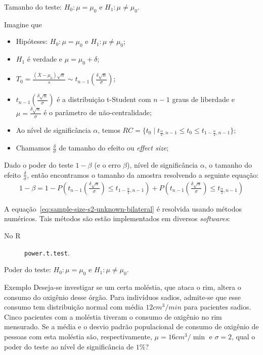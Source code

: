 \documentclass[8pt]{beamer}
\begin{document}
\begin{frame}{Tamanho do teste: $H_0:\mu = \mu_0$ e $H_1: \mu \neq \mu_0$.}

\small

Imagine que
\begin{itemize}
	\item Hipóteses: $H_0: \mu = \mu_0$ e $H_1: \mu \neq \mu_0$;
	\item $H_1$ é verdade e $\mu = \mu_0 + \delta$;
	\item $T_0 = \frac{(\bar{X} - \mu_0)\sqrt{n}}{s}  \sim t_{n-1}\left( \frac{\delta \sqrt{n}}{\sigma} \right)$;
	\item $t_{n-1}\left(\frac{\delta\sqrt{n}}{\sigma}\right)$ é a distribuição t-Student com $n-1$ graus de liberdade e $\mu=\frac{\delta \sqrt{n}}{\sigma}$ é o parâmetro de não-centralidade;
	\item Ao nível de significância $\alpha$, temos $RC = \{ t_0 \mid t_{\frac{\alpha}{2}, n-1} \leq t_0 \leq t_{1-\frac{\alpha}{2}, n-1}   \}$;
	\item Chamamos $\frac{\delta}{\sigma}$ de tamanho do efeito ou \textit{effect size};
\end{itemize}
\vfill

Dado o poder do teste $1-\beta$ (e o erro $\beta$), nível de significância $\alpha$, o tamanho do efeito $\frac{\delta}{\sigma}$, então encontramos o tamanho da amostra resolvendo a seguinte equação:
\begin{align}\label{eq:sample-size-s2-unknown-bilateral}
	1-\beta =1- P\left( t_{n-1}\left(\frac{\delta \sqrt{n}}{\sigma}\right) \leq t_{1-\frac{\alpha}{2}, n-1}  \right) + P\left( t_{n-1}\left(\frac{\delta \sqrt{n}}{\sigma}\right) \leq t_{\frac{\alpha}{2}, n-1}  \right)
\end{align}

A equação~\eqref{eq:sample-size-s2-unknown-bilateral} é resolvida usando métodos numéricos. Tais métodos são estão implementados em diversos \textit{softwares}:
\begin{description}
	\item[No R] \texttt{power.t.test}.
\end{description}

\normalsize

\end{frame}

\begin{frame}{Poder do teste: $H_0:\mu = \mu_0$ e $H_1: \mu \neq \mu_0$.}

\large
\begin{block}{Exemplo}
	Deseja-se investigar se um certa moléstia, que ataca o rim, altera o consumo do oxigênio desse órgão. Para indivíduos sadios, admite-se que esse consumo tem distribuição normal com média $12cm^3/min$ para pacientes sadios.
	Cinco pacientes com a moléstia tiveram o consumo de oxigênio no rim mensurado. Se a média e o desvio padrão populacional de consumo de oxigênio de pessoas com esta moléstia são, respectivamente, $\mu=16cm^3/\min$ e $\sigma=2$, qual o poder do teste ao nível de significância de $1\%$?
\end{block}
\normalsize

\end{frame}
\end{document}
